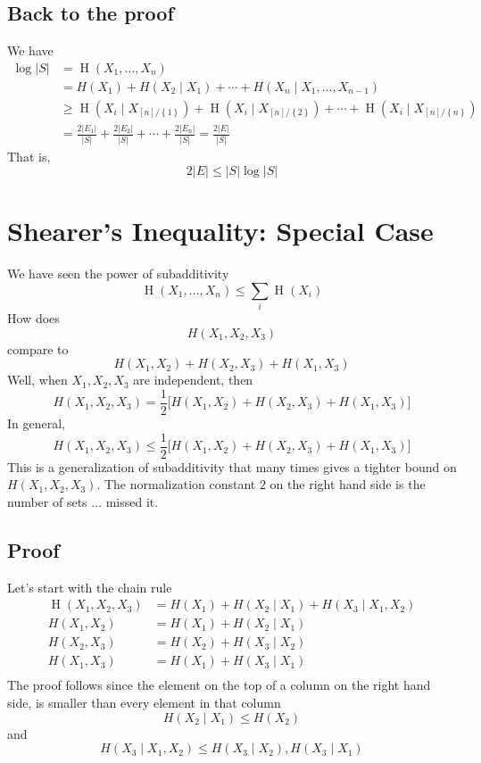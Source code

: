 \documentclass{article}
\begin{document}
\subsection{Back to the proof}
We have 
\begin{align*}
    \log \lvert S \rvert &= \operatorname{H}\left(X_1,\ldots, X_n\right)\\
    &= H(X_1) + H(X_2\mid X_1)+ \cdots + H(X_n\mid X_1,\dots, X_{n-1})\\
    & \geq \operatorname{H}\left(X_i\mid X_{[n] / \left\{1\right\}}\right) + \operatorname{H}\left(X_i\mid X_{[n] / \left\{2\right\}}\right) + \cdots + \operatorname{H}\left(X_i\mid X_{[n] / \left\{n\right\}}\right)\\
    & = \frac{2 \lvert E_1\rvert}{\lvert S \rvert} + \frac{2 \lvert E_2\rvert}{\lvert S \rvert} + \cdots + \frac{2 \lvert E_n\rvert}{\lvert S \rvert} = \frac{2 \lvert E \rvert}{\lvert S \rvert}
\end{align*}
That is,
\[
2\lvert E \rvert \leq  \lvert S \rvert\log \lvert S \rvert
\]

\section{Shearer's Inequality: Special Case}
We have seen the power of subadditivity
\[
\operatorname{H}\left(X_1,\ldots, X_n\right)\leq \sum_i \operatorname{H}\left(X_i\right)
\]
How does 
\[
H(X_1,X_2,X_3)
\]
compare to 
\[
H(X_1,X_2) + H(X_2,X_3) + H(X_1,X_3)
\]
Well, when $X_1,X_2,X_3$ are independent, then 
\[
H(X_1,X_2,X_3) = \frac{1}{2}\big[H(X_1,X_2) + H(X_2,X_3) + H(X_1,X_3)\big]
\]
In general, 
\[
H(X_1,X_2,X_3) \leq \frac{1}{2}\big[H(X_1,X_2) + H(X_2,X_3) + H(X_1,X_3)\big]
\]
This is a generalization of subadditivity that many times gives a tighter bound on $H(X_1,X_2,X_3)$. The normalization constant $2$ on the right hand side is the number of sets ... missed it.

\subsection{Proof}
Let's start with the chain rule
\begin{align*}
    \operatorname{H}\left(X_1,X_2,X_3\right) &= H(X_1) + H(X_2\mid X_1) + H(X_3\mid X_1, X_2)\\
    H(X_1,X_2) &= H(X_1) + H(X_2\mid X_1)\\
    H(X_2,X_3) &= H(X_2) + H(X_3\mid X_2)\\
    H(X_1,X_3) &= H(X_1) + H(X_3\mid X_1)\\
\end{align*}
The proof follows since the element on the top of a column on the right hand side, is smaller than every element in that column 
\[
H(X_2\mid X_1)\leq H(X_2)
\]
and 
\[
H(X_3\mid X_1, X_2) \leq H(X_3\mid X_2), H(X_3\mid X_1)
\]
\end{document}
